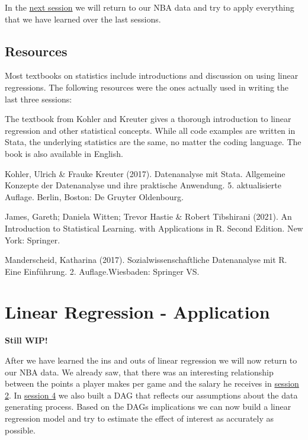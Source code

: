 \documentclass[
]{book}
\begin{document}
In the \protect\hyperlink{lin-a}{next session} we will return to our NBA data and try to apply everything that we have learned over the last sessions.

\hypertarget{resources-1}{%
\section{Resources}\label{resources-1}}

Most textbooks on statistics include introductions and discussion on using linear regressions. The following resources were the ones actually used in writing the last three sessions:

The textbook from Kohler and Kreuter gives a thorough introduction to linear regression and other statistical concepts. While all code examples are written in Stata, the underlying statistics are the same, no matter the coding language. The book is also available in English.

Kohler, Ulrich \& Frauke Kreuter (2017). Datenanalyse mit Stata. Allgemeine Konzepte der Datenanalyse und ihre praktische Anwendung. 5. aktualisierte Auflage. Berlin, Boston: De Gruyter Oldenbourg.

\hfill\break

James, Gareth; Daniela Witten; Trevor Hastie \& Robert Tibshirani (2021). An Introduction to Statistical Learning. with Applications in R. Second Edition. New York: Springer.

\hfill\break

Manderscheid, Katharina (2017). Sozialwissenschaftliche Datenanalyse mit R. Eine Einführung. 2. Auflage.Wiesbaden: Springer VS.

\hypertarget{lin-a}{%
\chapter{Linear Regression - Application}\label{lin-a}}

\textbf{Still WIP!}

After we have learned the ins and outs of linear regression we will now
return to our NBA data.
We already saw, that there was an interesting relationship between the
points a player makes per game and the salary he receives in \protect\hyperlink{eda-1}{session 2}. In
\protect\hyperlink{dags-1}{session 4} we also built a DAG that reflects our assumptions about the data
generating process. Based on the DAGs implications we can now build a linear
regression model and try to estimate the effect of interest as accurately as
possible.
\end{document}
